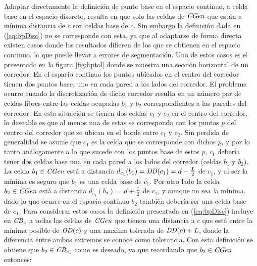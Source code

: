 
Adaptar directamente la definición de punto base en el espacio continuo, a
celda base en el espacio discreto, resulta en que solo las celdas de
$\mathit{CGen}$ que están a mínima distancia de $c$  son celdas base de $c$. Sin
embargo la definición dada en (\ref{eq:bpDisc}) no se corresponde con esta, ya
que al adaptarse de forma directa existen casos donde los resultados difieren
de los que se obtienen en el espacio continuo, lo que puede llevar a errores de
segmentación. 
Uno de estos casos es el presentado en la figura \ref{fig:bptol} donde se
muestra una sección horizontal de un corredor. En el espacio continuo los 
puntos ubicados en el centro del corredor tienen dos puntos base,
uno en cada pared a los lados del corredor.
El problema ocurre cuando la discretización de dicho corredor resulta en un
número par de celdas libres entre las celdas ocupadas $b_1$ y $b_2$ correspondientes a las
paredes del corredor. En esta situación se tienen dos celdas $c_1$ y $c_2$ en
el centro del corredor, lo deseable es que al menos una de estas se corresponda
con los puntos $p$ del centro del corredor que se ubican en el borde entre $c_1$ y $c_2$. Sin
perdida de generalidad se asume que $c_1$ es la celda que se corresponde con
dichos $p$, y por lo tanto análogamente a lo que sucede con los
puntos base de estos $p$, $c_1$ debería tener dos celdas base una en cada pared a los lados del
corredor (celdas $b_1$ y $b_2$).
La celda $b_1 \in \mathit{CGen}$ está a distancia $d_{c_1}(b_1) =
\mathit{DD}(c_1) = d-\frac{L}{2}$ de $c_1$, y al ser la mínima es seguro que $b_1$ es una celda base de
$c_1$. Por otro lado la celda $b_2 \in \mathit{CGen}$ está a distancia
$d_{c_1}(b_2) = d+\frac{L}{2}$ de $c_1$, y aunque no sea la mínima, dado lo
que ocurre en el espacio continuo $b_2$ también debería ser una celda base de $c_1$. Para
considerar estos casos la definición presentada en (\ref{eq:bpDisc}) incluye en
$\mathit{CB}_{c}$ a todas las celdas de $\mathit{CGen}$ que tienen una distancia a $c$
que está entre la mínima posible de $\mathit{DD}(c)$ y una maxima tolerada de
$\mathit{DD}(c)+L$, donde la diferencia entre ambos
extremos se conoce como tolerancia. Con esta definición se obtiene que $b_2 \in
\mathit{CB}_{c_1}$ como es deseado, ya que recordando que $b_2\in \mathit{CGen}$
entonces:

